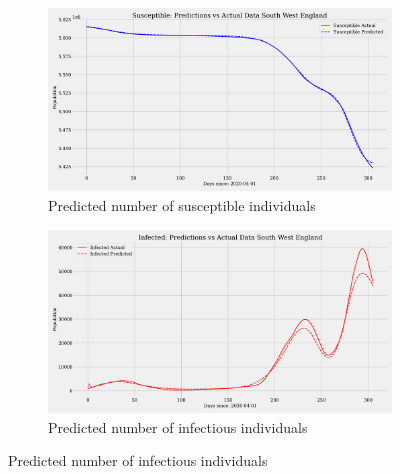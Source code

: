 \documentclass[12pt]{article}
\begin{document}
\begin{figure}[h]
    \centering
    \begin{subfigure}[t]{0.45\textwidth}
        \includegraphics[width=\textwidth]{images/pinn/S_predictions_South West England.pdf}
        \caption{Predicted number of susceptible individuals}
        \label{fig:S_predictions_South West England}
    \end{subfigure}
    \hfill %
    \begin{subfigure}[t]{0.45\textwidth}
        \includegraphics[width=\textwidth]{images/pinn/I_predictions_South West England.pdf}
        \caption{Predicted number of infectious individuals}
        \label{fig:I_predictions_South West England}
    \end{subfigure}

    \vspace{0.5cm}


\end{figure}
\end{document}
